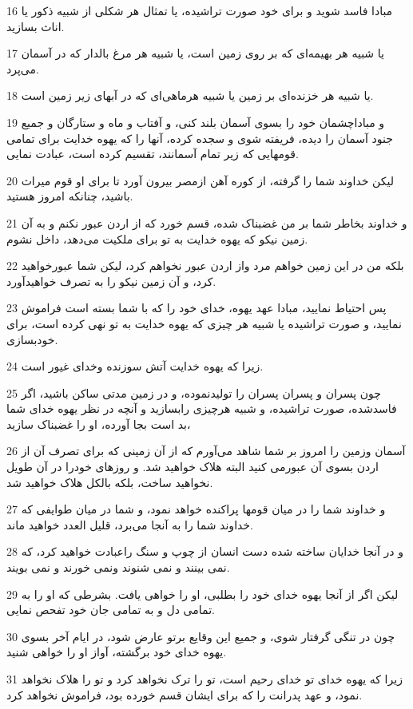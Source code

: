 \par 16 مبادا فاسد شوید و برای خود صورت تراشیده، یا تمثال هر شکلی از شبیه ذکور یا اناث بسازید.
\par 17 یا شبیه هر بهیمه‌ای که بر روی زمین است، یا شبیه هر مرغ بالدار که در آسمان می‌پرد.
\par 18 یا شبیه هر خزنده‌ای بر زمین یا شبیه هرماهی‌ای که در آبهای زیر زمین است.
\par 19 و مباداچشمان خود را بسوی آسمان بلند کنی، و آفتاب و ماه و ستارگان و جمیع جنود آسمان را دیده، فریفته شوی و سجده کرده، آنها را که یهوه خدایت برای تمامی قومهایی که زیر تمام آسمانند، تقسیم کرده است، عبادت نمایی.
\par 20 لیکن خداوند شما را گرفته، از کوره آهن ازمصر بیرون آورد تا برای او قوم میراث باشید، چنانکه امروز هستید.
\par 21 و خداوند بخاطر شما بر من غضبناک شده، قسم خورد که از اردن عبور نکنم و به آن زمین نیکو که یهوه خدایت به تو برای ملکیت می‌دهد، داخل نشوم.
\par 22 بلکه من در این زمین خواهم مرد واز اردن عبور نخواهم کرد، لیکن شما عبورخواهید کرد، و آن زمین نیکو را به تصرف خواهیدآورد.
\par 23 پس احتیاط نمایید، مبادا عهد یهوه، خدای خود را که با شما بسته است فراموش نمایید، و صورت تراشیده یا شبیه هر چیزی که یهوه خدایت به تو نهی کرده است، برای خودبسازی.
\par 24 زیرا که یهوه خدایت آتش سوزنده وخدای غیور است.
\par 25 چون پسران و پسران پسران را تولیدنموده، و در زمین مدتی ساکن باشید، اگر فاسدشده، صورت تراشیده، و شبیه هرچیزی رابسازید و آنچه در نظر یهوه خدای شما بد است بجا آورده، او را غضبناک سازید،
\par 26 آسمان وزمین را امروز بر شما شاهد می‌آورم که از آن زمینی که برای تصرف آن از اردن بسوی آن عبورمی کنید البته هلاک خواهید شد. و روزهای خودرا در آن طویل نخواهید ساخت، بلکه بالکل هلاک خواهید شد.
\par 27 و خداوند شما را در میان قومها پراکنده خواهد نمود، و شما در میان طوایفی که خداوند شما را به آنجا می‌برد، قلیل العدد خواهید ماند.
\par 28 و در آنجا خدایان ساخته شده دست انسان از چوپ و سنگ راعبادت خواهید کرد، که نمی بینند و نمی شنوند ونمی خورند و نمی بویند.
\par 29 لیکن اگر از آنجا یهوه خدای خود را بطلبی، او را خواهی یافت. بشرطی که او را به تمامی دل و به تمامی جان خود تفحص نمایی.
\par 30 چون در تنگی گرفتار شوی، و جمیع این وقایع برتو عارض شود، در ایام آخر بسوی یهوه خدای خود برگشته، آواز او را خواهی شنید.
\par 31 زیرا که یهوه خدای تو خدای رحیم است، تو را ترک نخواهد کرد و تو را هلاک نخواهد نمود، و عهد پدرانت را که برای ایشان قسم خورده بود، فراموش نخواهد کرد.
